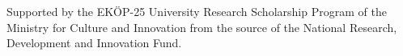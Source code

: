 \documentclass[sigconf]{acmart}
\begin{document}
\begin{acks}
Supported by the EKÖP-25 University Research Scholarship Program of the Ministry for Culture and Innovation from the source of the National Research, Development and Innovation Fund.
\end{acks}




\end{document}
